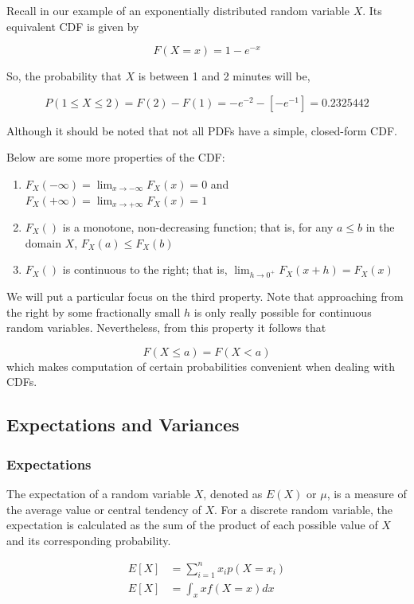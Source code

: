 \documentclass{article}
\begin{document}
Recall in our example of an exponentially distributed random variable $X$. Its equivalent CDF is given by

$$
F(X = x) = 1 - e^{-x}
$$

So, the probability that $X$ is between 1 and 2 minutes will be,

$$
P(1 \leq X \leq 2) = F(2) - F(1) = -e^{-2} - [-e^{-1}] = 0.2325442
$$

Although it should be noted that not all PDFs have a simple, closed-form CDF.

Below are some more properties of the CDF:

\begin{enumerate}
\item $F_X(-\infty) = \lim_{x \to -\infty}{F_X(x) = 0}$ and $F_X(+\infty) = \lim_{x \to +\infty}{F_X(x) = 1}$
\item $F_X()$ is a monotone, non-decreasing function; that is, for any $a \leq b$ in the domain $X$, $F_X(a) \leq F_X(b)$
\item $F_X()$ is continuous to the right; that is, $\lim_{h \to 0^{+}}{F_X(x + h) = F_X(x)}$
\end{enumerate}

We will put a particular focus on the third property. Note that approaching from the right by some fractionally small $h$ is only really possible for continuous random variables. Nevertheless, from this property it follows that

$$
F(X \leq a) = F(X < a)
$$
which makes computation of certain probabilities convenient when dealing with CDFs.

\subsection{Expectations and Variances}

\subsubsection{Expectations}

The expectation of a random variable $X$, denoted as $E(X)$ or $\mu$, is a measure of the average value or central tendency of $X$. For a discrete random variable, the expectation is calculated as the sum of the product of each possible value of $X$ and its corresponding probability. 

$$
\begin{aligned}
E[X] & = \sum_{i=1}^{n}{x_i p(X = x_i)} \\
E[X] & = \int_{x}{x f(X = x)dx}
\end{aligned}
$$
\end{document}
